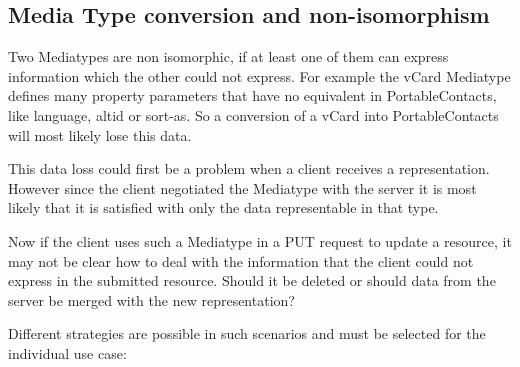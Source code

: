 \documentclass[11pt,a4paper,headsepline,twoside]{scrartcl}		%
\begin{document}



\subsection{Media Type conversion and non-isomorphism}

Two Mediatypes are non isomorphic, if at least one of them can express
information which the other could not express. For example the vCard Mediatype
defines many property parameters that have no equivalent in PortableContacts,
like language, altid or sort-as. So a conversion of a vCard into
PortableContacts will most likely lose this data.

This data loss could first be a problem when a client receives a
representation. However since the client negotiated the Mediatype with the
server it is most likely that it is satisfied with only the data representable
in that type.

Now if the client uses such a Mediatype in a PUT request to update a resource,
it may not be clear how to deal with the information that the client could not
express in the submitted resource. Should it be deleted or should data from the
server be merged with the new representation?

Different strategies are possible in such scenarios and must be selected for the
individual use case:
\end{document}
